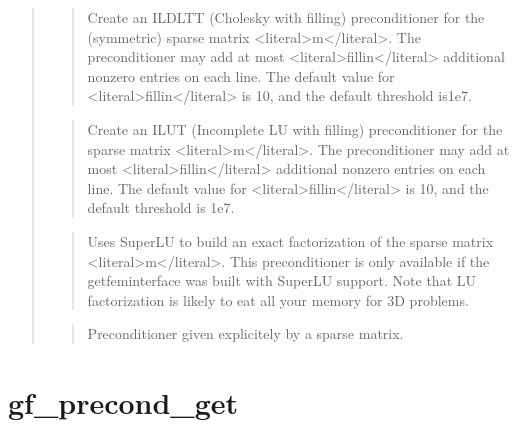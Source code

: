 \documentclass[a4paper,11pt,english]{sphinxmanual}
\begin{document}
\begin{quote}
\begin{quote}
\sphinxAtStartPar
Create an ILDLTT (Cholesky with filling) preconditioner for the
(symmetric) sparse matrix \textless{}literal\textgreater{}m\textless{}/literal\textgreater{}. The preconditioner may add at most
\textless{}literal\textgreater{}fillin\textless{}/literal\textgreater{} additional non\sphinxhyphen{}zero entries on each line. The default value
for \textless{}literal\textgreater{}fillin\textless{}/literal\textgreater{} is 10, and the default threshold is1e\sphinxhyphen{}7.
\end{quote}

\sphinxAtStartPar
{}
\begin{quote}

\sphinxAtStartPar
Create an ILUT (Incomplete LU with filling) preconditioner for the
sparse matrix \textless{}literal\textgreater{}m\textless{}/literal\textgreater{}. The preconditioner may add at most \textless{}literal\textgreater{}fillin\textless{}/literal\textgreater{}
additional non\sphinxhyphen{}zero entries on each line. The default value for
\textless{}literal\textgreater{}fillin\textless{}/literal\textgreater{} is 10, and the default threshold is 1e\sphinxhyphen{}7.
\end{quote}

\sphinxAtStartPar
{}
\begin{quote}

\sphinxAtStartPar
Uses SuperLU to build an exact factorization of the sparse matrix \textless{}literal\textgreater{}m\textless{}/literal\textgreater{}.
This preconditioner is only available if the getfem\sphinxhyphen{}interface was
built with SuperLU support. Note that LU factorization is likely to
eat all your memory for 3D problems.
\end{quote}

\sphinxAtStartPar
{}
\begin{quote}

\sphinxAtStartPar
Preconditioner given explicitely by a sparse matrix.
\end{quote}
\end{quote}


\section{gf\_precond\_get}
\label{\detokenize{scilab/cmdref_gf_precond_get:gf-precond-get}}\label{\detokenize{scilab/cmdref_gf_precond_get::doc}}
\sphinxAtStartPar
{}
\end{document}
